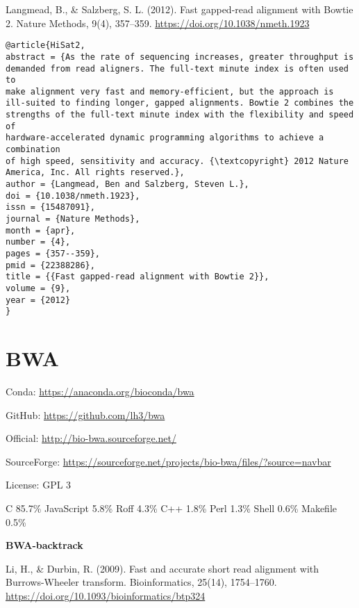 \documentclass[]{article}
\begin{document}
Langmead, B., \& Salzberg, S. L. (2012). Fast gapped-read alignment with Bowtie 2. Nature Methods, 9(4), 357–359. \url{https://doi.org/10.1038/nmeth.1923}


\begin{verbatim}
@article{HiSat2,
abstract = {As the rate of sequencing increases, greater throughput is
demanded from read aligners. The full-text minute index is often used to
make alignment very fast and memory-efficient, but the approach is
ill-suited to finding longer, gapped alignments. Bowtie 2 combines the
strengths of the full-text minute index with the flexibility and speed of
hardware-accelerated dynamic programming algorithms to achieve a combination
of high speed, sensitivity and accuracy. {\textcopyright} 2012 Nature
America, Inc. All rights reserved.},
author = {Langmead, Ben and Salzberg, Steven L.},
doi = {10.1038/nmeth.1923},
issn = {15487091},
journal = {Nature Methods},
month = {apr},
number = {4},
pages = {357--359},
pmid = {22388286},
title = {{Fast gapped-read alignment with Bowtie 2}},
volume = {9},
year = {2012}
}
\end{verbatim}

\section{BWA}

Conda: \url{https://anaconda.org/bioconda/bwa}

GitHub: \url{https://github.com/lh3/bwa}

Official: \url{http://bio-bwa.sourceforge.net/}

SourceForge: \url{https://sourceforge.net/projects/bio-bwa/files/?source=navbar}

License: GPL 3

C 85.7\% JavaScript 5.8\% Roff 4.3\% C++ 1.8\% Perl 1.3\% Shell 0.6\% Makefile 0.5\%



\textbf{BWA-backtrack}

Li, H., \& Durbin, R. (2009). Fast and accurate short read alignment with Burrows-Wheeler transform. Bioinformatics, 25(14), 1754–1760. \url{https://doi.org/10.1093/bioinformatics/btp324}
\end{document}
